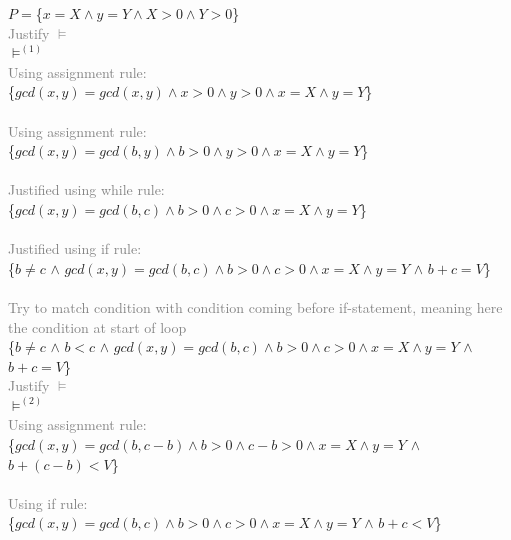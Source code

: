 \documentclass{article}
\begin{document}
\begin{enumerate}
    $P=$\{$x=X \land y=Y\land X > 0 \land Y >0$\}
    \\  \textcolor{gray}{Justify $\vDash$} \\
    $\vDash^{(1)}$ \\ 
    \textcolor{gray}{Using assignment rule:} \\
    \{$gcd(x,y)=gcd(x,y) \land x >0 \land y > 0 \land x=X \land y=Y$\}
    \\
     \\
    \textcolor{gray}{Using assignment rule:} \\
    \{$gcd(x,y)=gcd(b,y) \land b >0 \land y > 0 \land x=X \land y=Y$\}
    \\
     \\
    \textcolor{gray}{Justified using while rule:} \\
    \{\colorbox{blue!10}{$gcd(x,y)=gcd(b,c) \land b >0 \land c > 0 \land x=X \land y=Y$}\}
    \\
     \\
    \textcolor{gray}{Justified using if rule:} \\
    \{\colorbox{magenta!10}{$b \neq c$} $\land$ \colorbox{blue!10}{$gcd(x,y)=gcd(b,c) \land b >0 \land c > 0 \land x=X \land y=Y$}
    $\land$ \colorbox{teal!10}{$b+c = V$}\}
    \\
     \\
    \textcolor{gray}{Try to match condition with condition coming before if-statement, meaning here the condition at start of loop} \\
    \{\colorbox{magenta!10}{$b \neq c$} $\land$ \colorbox{NavyBlue!10}{$b<c$} $\land$ \colorbox{blue!10}{$gcd(x,y)=gcd(b,c) \land b > 0 \land c > 0 \land x=X \land y=Y$}
    $\land$ \colorbox{teal!10}{$b+c = V$}\} 
    \\  \textcolor{gray}{Justify $\vDash$} \\
    $\vDash^{(2)}$ \\
    \textcolor{gray}{Using assignment rule:} \\
    \{$gcd(x,y)=gcd(b,c-b) \land b > 0 \land c-b > 0 \land x=X \land y=Y$ $\land$ \colorbox{teal!10}{$b+(c-b) < V$}\} 
    \\
     \\
    \textcolor{gray}{Using if rule:} \\
    \{$gcd(x,y)=gcd(b,c) \land b >0 \land c > 0 \land x=X \land y=Y$ $\land$ \colorbox{teal!10}{$b+c < V$}\} 

\end{enumerate}
\end{document}
